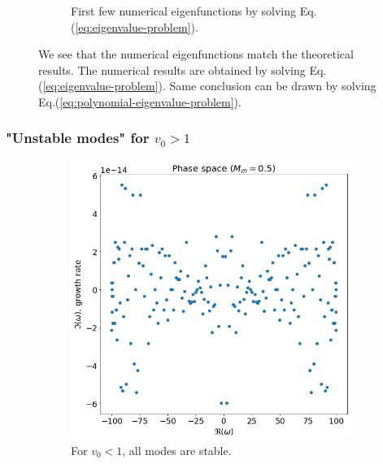 \documentclass{article}
\theoremstyle{plain}
\theoremstyle{definition}
\theoremstyle{remark}
\theoremstyle{remark}
\begin{document}
\begin{figure}[H]
\begin{subfigure}[b]{0.45\linewidth}
        \caption{First few numerical eigenfunctions by solving Eq.(\ref{eq:eigenvalue-problem}).}
    \end{subfigure}
    \caption{We see that the numerical eigenfunctions match the theoretical results. The numerical results are obtained by solving Eq.(\ref{eq:eigenvalue-problem}). Same conclusion can be drawn by solving Eq.(\ref{eq:polynomial-eigenvalue-problem}).}
    \label{fig:eigenvectors-constant-v}
\end{figure}

\subsubsection{"Unstable modes" for $v_0>1$}

\begin{figure}[H]
    \centering
    \begin{subfigure}[b]{0.5\linewidth}
        \includegraphics[width=\linewidth]{img/phase-space-constant-v<1.png}
        \caption{For $v_0<1$, all modes are stable.}
    \end{subfigure}%
    \begin{subfigure}[b]{0.5\linewidth}

\end{subfigure}
\end{figure}
\end{document}
